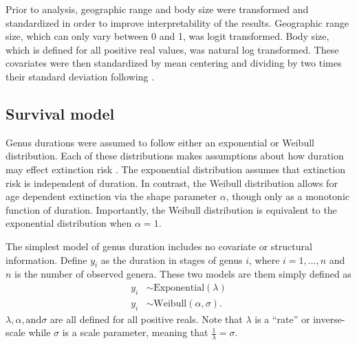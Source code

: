\documentclass[12pt,letterpaper]{article}
\begin{document}
Prior to analysis, geographic range and body size were transformed and standardized in order to improve interpretability of the results. Geographic range size, which can only vary between 0 and 1, was logit transformed. Body size, which is defined for all positive real values, was natural log transformed. These covariates were then standardized by mean centering and dividing by two times their standard deviation following \citet{Gelman2007}.


\subsection{Survival model}

Genus durations were assumed to follow either an exponential or Weibull distribution. Each of these distributions makes assumptions about how duration may effect extinction risk \citep{Klein2003}. The exponential distribution assumes that extinction risk is independent of duration. In contrast, the Weibull distribution allows for age dependent extinction via the shape parameter \(\alpha\), though only as a monotonic function of duration. Importantly, the Weibull distribution is equivalent to the exponential distribution when \(\alpha = 1\). %

The simplest model of genus duration includes no covariate or structural information. Define \(y_{i}\) as the duration in stages of genus \(i\), where \(i = 1, \dots, n\) and \(n\) is the number of observed genera. These two models are them simply defined as
\begin{equation}
  \begin{aligned}
    y_{i} &\sim \mathrm{Exponential}(\lambda) \\
    y_{i} &\sim \mathrm{Weibull}(\alpha, \sigma).
  \end{aligned}
  \label{eq:simple}
\end{equation}
\(\lambda, \alpha, \text{and} \sigma\) are all defined for all positive reals. Note that \(\lambda\) is a ``rate'' or inverse-scale while \(\sigma\) is a scale parameter, meaning that \(\frac{1}{\lambda} = \sigma\).
\end{document}
